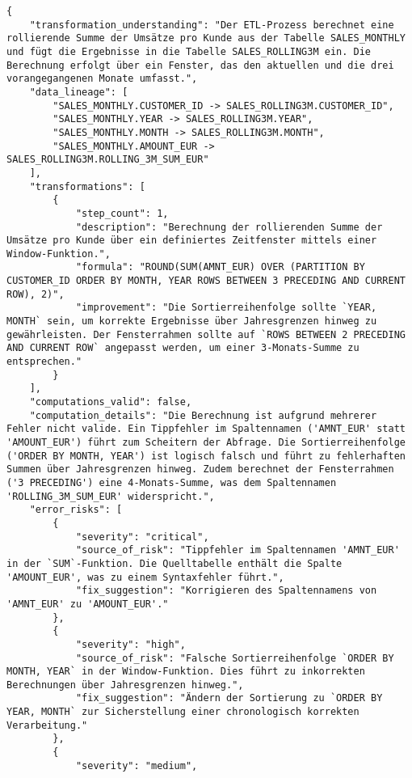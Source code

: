 \begin{lstlisting}[caption={Ausgabe: GEMINI 2.5 Pro Anwendungsfall 8 Hauptdurchlauf},label={gemini_case8_prompt1}]
{
    "transformation_understanding": "Der ETL-Prozess berechnet eine rollierende Summe der Umsätze pro Kunde aus der Tabelle SALES_MONTHLY und fügt die Ergebnisse in die Tabelle SALES_ROLLING3M ein. Die Berechnung erfolgt über ein Fenster, das den aktuellen und die drei vorangegangenen Monate umfasst.",
    "data_lineage": [
        "SALES_MONTHLY.CUSTOMER_ID -> SALES_ROLLING3M.CUSTOMER_ID",
        "SALES_MONTHLY.YEAR -> SALES_ROLLING3M.YEAR",
        "SALES_MONTHLY.MONTH -> SALES_ROLLING3M.MONTH",
        "SALES_MONTHLY.AMOUNT_EUR -> SALES_ROLLING3M.ROLLING_3M_SUM_EUR"
    ],
    "transformations": [
        {
            "step_count": 1,
            "description": "Berechnung der rollierenden Summe der Umsätze pro Kunde über ein definiertes Zeitfenster mittels einer Window-Funktion.",
            "formula": "ROUND(SUM(AMNT_EUR) OVER (PARTITION BY CUSTOMER_ID ORDER BY MONTH, YEAR ROWS BETWEEN 3 PRECEDING AND CURRENT ROW), 2)",
            "improvement": "Die Sortierreihenfolge sollte `YEAR, MONTH` sein, um korrekte Ergebnisse über Jahresgrenzen hinweg zu gewährleisten. Der Fensterrahmen sollte auf `ROWS BETWEEN 2 PRECEDING AND CURRENT ROW` angepasst werden, um einer 3-Monats-Summe zu entsprechen."
        }
    ],
    "computations_valid": false,
    "computation_details": "Die Berechnung ist aufgrund mehrerer Fehler nicht valide. Ein Tippfehler im Spaltennamen ('AMNT_EUR' statt 'AMOUNT_EUR') führt zum Scheitern der Abfrage. Die Sortierreihenfolge ('ORDER BY MONTH, YEAR') ist logisch falsch und führt zu fehlerhaften Summen über Jahresgrenzen hinweg. Zudem berechnet der Fensterrahmen ('3 PRECEDING') eine 4-Monats-Summe, was dem Spaltennamen 'ROLLING_3M_SUM_EUR' widerspricht.",
    "error_risks": [
        {
            "severity": "critical",
            "source_of_risk": "Tippfehler im Spaltennamen 'AMNT_EUR' in der `SUM`-Funktion. Die Quelltabelle enthält die Spalte 'AMOUNT_EUR', was zu einem Syntaxfehler führt.",
            "fix_suggestion": "Korrigieren des Spaltennamens von 'AMNT_EUR' zu 'AMOUNT_EUR'."
        },
        {
            "severity": "high",
            "source_of_risk": "Falsche Sortierreihenfolge `ORDER BY MONTH, YEAR` in der Window-Funktion. Dies führt zu inkorrekten Berechnungen über Jahresgrenzen hinweg.",
            "fix_suggestion": "Ändern der Sortierung zu `ORDER BY YEAR, MONTH` zur Sicherstellung einer chronologisch korrekten Verarbeitung."
        },
        {
            "severity": "medium",

\end{lstlisting}
